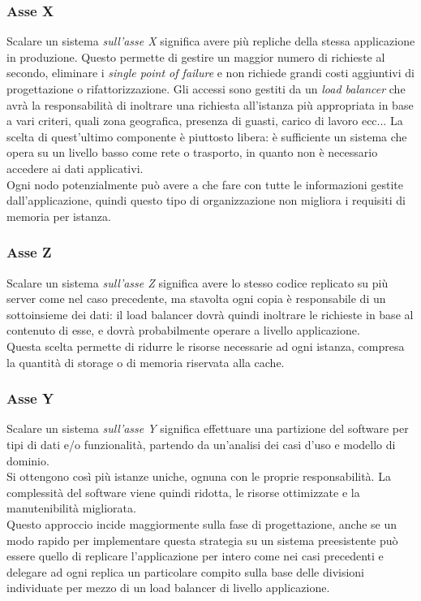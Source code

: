 \subsubsection{Asse X}
Scalare un sistema \textit{sull'asse X} significa avere più repliche della stessa applicazione in produzione.
Questo permette di gestire un maggior numero di richieste al secondo, eliminare i \textit{single point of failure} e non richiede grandi costi aggiuntivi di progettazione o rifattorizzazione.
Gli accessi sono gestiti da un \textit{load balancer} che avrà la responsabilità di inoltrare una richiesta all'istanza più appropriata in base a vari criteri, quali zona geografica, presenza di guasti, carico di lavoro ecc...
La scelta di quest'ultimo componente è piuttosto libera: è sufficiente un sistema che opera su un livello basso come rete o trasporto, in quanto non è necessario accedere ai dati applicativi.\\
Ogni nodo potenzialmente può avere a che fare con tutte le informazioni gestite dall'applicazione, quindi questo tipo di organizzazione non migliora i requisiti di memoria per istanza.

\subsubsection{Asse Z}
Scalare un sistema \textit{sull'asse Z} significa avere lo stesso codice replicato su più server come nel caso precedente, ma stavolta ogni copia è responsabile di un sottoinsieme dei dati: il load balancer dovrà quindi inoltrare le richieste in base al contenuto di esse, e dovrà probabilmente operare a livello applicazione.\\
Questa scelta permette di ridurre le risorse necessarie ad ogni istanza, compresa la quantità di storage o di memoria riservata alla cache.

\subsubsection{Asse Y}
Scalare un sistema \textit{sull'asse Y} significa effettuare una partizione del software per tipi di dati e/o funzionalità, partendo da un'analisi dei casi d'uso e modello di dominio.\\
Si ottengono così più istanze uniche, ognuna con le proprie responsabilità.
La complessità del software viene quindi ridotta, le risorse ottimizzate e la manutenibilità migliorata.\\
Questo approccio incide maggiormente sulla fase di progettazione, anche se un modo rapido per implementare questa strategia su un sistema preesistente può essere quello di replicare l'applicazione per intero come nei casi precedenti e delegare ad ogni replica un particolare compito sulla base delle divisioni individuate per mezzo di un load balancer di livello applicazione.

